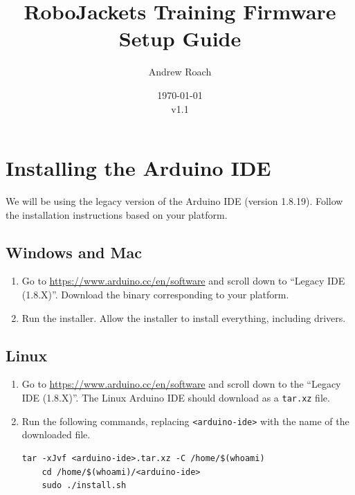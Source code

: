 \documentclass{article}
\title{RoboJackets Training Firmware Setup Guide}
\author{Andrew Roach}
\date{\today\\v1.1}
\begin{document}
\maketitle{}
\setcounter{tocdepth}{2}
\tableofcontents
\pagebreak

\begin{versionhistory}
\end{versionhistory}

\clearpage

\section{Installing the Arduino IDE}

We will be using the legacy version of the Arduino IDE (version 1.8.19). Follow the installation instructions based on your platform.

\subsection{Windows and Mac}

\begin{enumerate}
    \item Go to \url{https://www.arduino.cc/en/software} and scroll down to ``Legacy IDE (1.8.X)''. Download the binary corresponding to your platform.
    \item Run the installer. Allow the installer to install everything, including drivers.
\end{enumerate}

\subsection{Linux}

\begin{enumerate}
    \item Go to \url{https://www.arduino.cc/en/software} and scroll down to the ``Legacy IDE (1.8.X)''. The Linux Arduino IDE should download as a \verb|tar.xz| file.
    \item Run the following commands, replacing \verb|<arduino-ide>| with the name of the downloaded file.
    \begin{lstlisting}[style=bashstyle, label=lst:mybashcode]
    tar -xJvf <arduino-ide>.tar.xz -C /home/$(whoami)
    cd /home/$(whoami)/<arduino-ide>
    sudo ./install.sh
    \end{lstlisting}
\end{enumerate}
\end{document}
